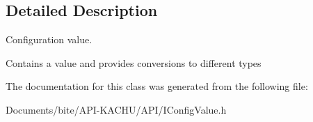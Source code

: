\subsection{Detailed Description}
Configuration value. 

Contains a value and provides conversions to different types 

The documentation for this class was generated from the following file\+:\begin{DoxyCompactItemize}
\item 
Documents/bite/\+A\+P\+I-\/\+K\+A\+C\+H\+U/\+A\+P\+I/I\+Config\+Value.\+h\end{DoxyCompactItemize}
